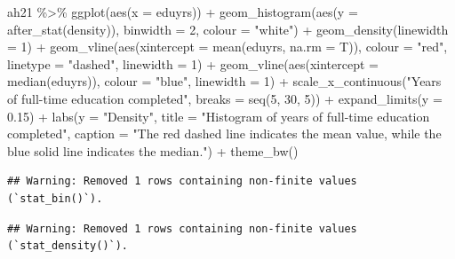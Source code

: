 \documentclass[
]{article}
\newenvironment{Shaded}{\begin{snugshade}}{\end{snugshade}}
\newcommand{\AttributeTok}[1]{\textcolor[rgb]{0.77,0.63,0.00}{#1}}
\newcommand{\DecValTok}[1]{\textcolor[rgb]{0.00,0.00,0.81}{#1}}
\newcommand{\FloatTok}[1]{\textcolor[rgb]{0.00,0.00,0.81}{#1}}
\newcommand{\FunctionTok}[1]{\textcolor[rgb]{0.00,0.00,0.00}{#1}}
\newcommand{\NormalTok}[1]{#1}
\newcommand{\SpecialCharTok}[1]{\textcolor[rgb]{0.00,0.00,0.00}{#1}}
\newcommand{\StringTok}[1]{\textcolor[rgb]{0.31,0.60,0.02}{#1}}
\begin{document}
\begin{Shaded}
\begin{Highlighting}[]
\NormalTok{ah21 }\SpecialCharTok{\%\textgreater{}\%}
  \FunctionTok{ggplot}\NormalTok{(}\FunctionTok{aes}\NormalTok{(}\AttributeTok{x =}\NormalTok{ eduyrs)) }\SpecialCharTok{+}
  \FunctionTok{geom\_histogram}\NormalTok{(}\FunctionTok{aes}\NormalTok{(}\AttributeTok{y =} \FunctionTok{after\_stat}\NormalTok{(density)), }\AttributeTok{binwidth =} \DecValTok{2}\NormalTok{, }\AttributeTok{colour =} \StringTok{"white"}\NormalTok{) }\SpecialCharTok{+}
  \FunctionTok{geom\_density}\NormalTok{(}\AttributeTok{linewidth =} \DecValTok{1}\NormalTok{) }\SpecialCharTok{+}
  \FunctionTok{geom\_vline}\NormalTok{(}\FunctionTok{aes}\NormalTok{(}\AttributeTok{xintercept =} \FunctionTok{mean}\NormalTok{(eduyrs, }\AttributeTok{na.rm =}\NormalTok{ T)), }
             \AttributeTok{colour =} \StringTok{"red"}\NormalTok{, }\AttributeTok{linetype =} \StringTok{"dashed"}\NormalTok{, }\AttributeTok{linewidth =} \DecValTok{1}\NormalTok{) }\SpecialCharTok{+}
  \FunctionTok{geom\_vline}\NormalTok{(}\FunctionTok{aes}\NormalTok{(}\AttributeTok{xintercept =} \FunctionTok{median}\NormalTok{(eduyrs)), }
             \AttributeTok{colour =} \StringTok{"blue"}\NormalTok{, }\AttributeTok{linewidth =} \DecValTok{1}\NormalTok{) }\SpecialCharTok{+}
  \FunctionTok{scale\_x\_continuous}\NormalTok{(}\StringTok{"Years of full{-}time education completed"}\NormalTok{, }\AttributeTok{breaks =} \FunctionTok{seq}\NormalTok{(}\DecValTok{5}\NormalTok{, }\DecValTok{30}\NormalTok{, }\DecValTok{5}\NormalTok{)) }\SpecialCharTok{+}
  \FunctionTok{expand\_limits}\NormalTok{(}\AttributeTok{y =} \FloatTok{0.15}\NormalTok{) }\SpecialCharTok{+}
  \FunctionTok{labs}\NormalTok{(}\AttributeTok{y =} \StringTok{"Density"}\NormalTok{, }\AttributeTok{title =} \StringTok{"Histogram of \textquotesingle{}years of full{-}time education completed\textquotesingle{}"}\NormalTok{, }
       \AttributeTok{caption =} \StringTok{"The red dashed line indicates the mean value, while the blue solid line indicates the median."}\NormalTok{) }\SpecialCharTok{+}
  \FunctionTok{theme\_bw}\NormalTok{() }
\end{Highlighting}
\end{Shaded}

\begin{verbatim}
## Warning: Removed 1 rows containing non-finite values (`stat_bin()`).
\end{verbatim}

\begin{verbatim}
## Warning: Removed 1 rows containing non-finite values (`stat_density()`).
\end{verbatim}
\end{document}
